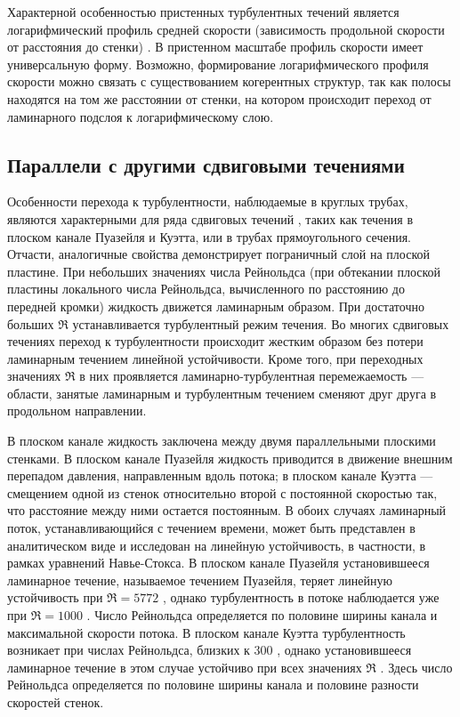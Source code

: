 Характерной особенностью пристенных турбулентных течений является логарифмический профиль средней скорости (зависимость продольной скорости от расстояния до стенки) \cite{Kim1987}. В пристенном масштабе профиль скорости имеет универсальную форму. Возможно, формирование логарифмического профиля скорости можно связать с существованием когерентных структур, так как полосы находятся на том же расстоянии от стенки, на котором происходит переход от ламинарного подслоя к логарифмическому слою.


	\subsection{Параллели с другими сдвиговыми течениями}

Особенности перехода к турбулентности, наблюдаемые в круглых трубах, являются характерными для ряда сдвиговых течений \cite{Manneville2015, Manneville2016}, таких как течения в плоском канале Пуазейля и Куэтта, или в трубах прямоугольного сечения. Отчасти, аналогичные свойства демонстрирует пограничный слой на плоской пластине. При небольших значениях числа Рейнольдса (при обтекании плоской пластины локального числа Рейнольдса, вычисленного по расстоянию до передней кромки) жидкость движется ламинарным образом. При достаточно больших $\Re$ устанавливается турбулентный режим течения. Во многих сдвиговых течениях переход к турбулентности происходит жестким образом без потери ламинарным течением линейной устойчивости. Кроме того, при переходных значениях $\Re$ в них проявляется ламинарно-турбулентная перемежаемость --- области, занятые ламинарным и турбулентным течением сменяют друг друга в продольном направлении.  

В плоском канале жидкость заключена между двумя параллельными плоскими стенками. В плоском канале Пуазейля жидкость приводится в движение внешним перепадом давления, направленным вдоль потока; в плоском канале Куэтта --- смещением одной из стенок относительно второй с постоянной скоростью так, что расстояние между ними остается постоянным. В обоих случаях ламинарный поток, устанавливающийся с течением времени, может быть представлен в аналитическом виде и исследован на линейную устойчивость, в частности, в рамках уравнений Навье-Стокса. В плоском канале Пуазейля установившееся ламинарное течение, называемое течением Пуазейля, теряет линейную устойчивость при $\Re = 5772$ \cite{Orszag1971}, однако турбулентность в потоке наблюдается уже при $\Re = 1000$ \cite{Orszag1980}. Число Рейнольдса определяется по половине ширины канала и максимальной скорости потока. В плоском канале Куэтта турбулентность возникает при числах Рейнольдса, близких к $300$ \cite{Bottin1998}, однако установившееся ламинарное течение в этом случае устойчиво при всех значениях $\Re$ \cite{Romanov1973}. Здесь число Рейнольдса определяется по половине ширины канала и половине разности скоростей стенок. 

